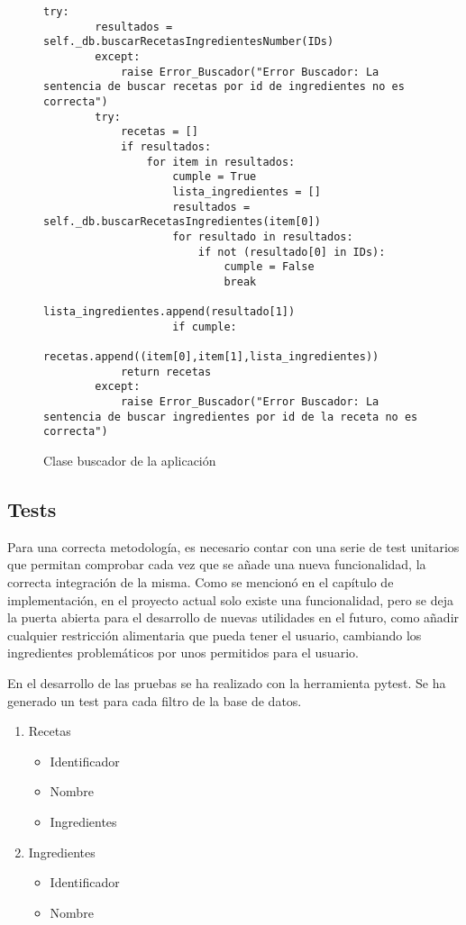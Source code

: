 \begin{figure}[H!]
    \begin{lstlisting}[style=C, caption={Método del buscador para buscar recetas por ingredientes}]
        try:
        resultados =  self._db.buscarRecetasIngredientesNumber(IDs)
        except:
            raise Error_Buscador("Error Buscador: La sentencia de buscar recetas por id de ingredientes no es correcta")
        try:
            recetas = []
            if resultados:
                for item in resultados:
                    cumple = True
                    lista_ingredientes = []
                    resultados = self._db.buscarRecetasIngredientes(item[0])
                    for resultado in resultados:
                        if not (resultado[0] in IDs):
                            cumple = False
                            break
                        lista_ingredientes.append(resultado[1])
                    if cumple:
                        recetas.append((item[0],item[1],lista_ingredientes))
            return recetas
        except:
            raise Error_Buscador("Error Buscador: La sentencia de buscar ingredientes por id de la receta no es correcta")
    \end{lstlisting}
        \caption{Clase buscador de la aplicación}
        \label{cmd:buscador}
    \end{figure}


\subsection{Tests}
Para una correcta metodología, es necesario contar con una serie de test unitarios que permitan comprobar cada vez que se añade una nueva funcionalidad, la correcta integración de la misma. Como se mencionó en el capítulo de implementación, en el proyecto actual solo existe una funcionalidad, pero se deja la puerta abierta para el desarrollo de nuevas utilidades en el futuro, como añadir cualquier restricción alimentaria que pueda tener el usuario, cambiando los ingredientes problemáticos por unos permitidos para el usuario. 

En el desarrollo de las pruebas se ha realizado con la herramienta pytest. Se ha generado un \gls{test} para cada filtro de la base de datos.
\begin{enumerate}
    \item Recetas
    \begin{itemize}
        \item Identificador
        \item Nombre
        \item Ingredientes
    \end{itemize}
    \item Ingredientes
    \begin{itemize}
        \item Identificador
        \item Nombre
    \end{itemize}
\end{enumerate}

